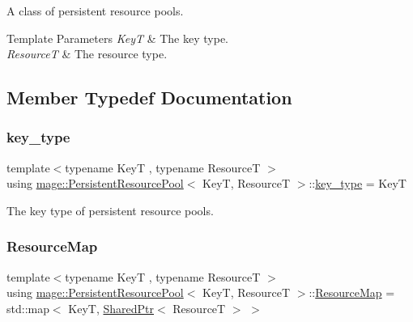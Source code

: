 A class of persistent resource pools.


\begin{DoxyTemplParams}{Template Parameters}
{\em KeyT} & The key type. \\
\hline
{\em ResourceT} & The resource type. \\
\hline
\end{DoxyTemplParams}


\subsection{Member Typedef Documentation}
\hypertarget{classmage_1_1_persistent_resource_pool_a8041d9d11d2307efc6d5b6dd43074e0c}{}\label{classmage_1_1_persistent_resource_pool_a8041d9d11d2307efc6d5b6dd43074e0c} 
\subsubsection{\texorpdfstring{key\+\_\+type}{key\_type}}
{\footnotesize\ttfamily template$<$typename KeyT , typename ResourceT $>$ \\
using \hyperlink{classmage_1_1_persistent_resource_pool}{mage\+::\+Persistent\+Resource\+Pool}$<$ KeyT, ResourceT $>$\+::\hyperlink{classmage_1_1_persistent_resource_pool_a8041d9d11d2307efc6d5b6dd43074e0c}{key\+\_\+type} =  KeyT}

The key type of persistent resource pools. \hypertarget{classmage_1_1_persistent_resource_pool_a9215c5816fc45ab5f772625df2a8a60c}{}\label{classmage_1_1_persistent_resource_pool_a9215c5816fc45ab5f772625df2a8a60c} 
\subsubsection{\texorpdfstring{Resource\+Map}{ResourceMap}}
{\footnotesize\ttfamily template$<$typename KeyT , typename ResourceT $>$ \\
using \hyperlink{classmage_1_1_persistent_resource_pool}{mage\+::\+Persistent\+Resource\+Pool}$<$ KeyT, ResourceT $>$\+::\hyperlink{classmage_1_1_persistent_resource_pool_a9215c5816fc45ab5f772625df2a8a60c}{Resource\+Map} =  std\+::map$<$ KeyT, \hyperlink{namespacemage_a1e01ae66713838a7a67d30e44c67703e}{Shared\+Ptr}$<$ ResourceT $>$ $>$\hspace{0.3cm}{\ttfamily [private]}}

